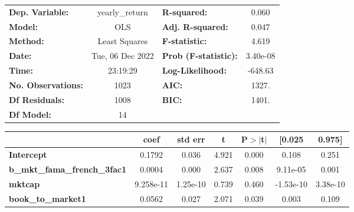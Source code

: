\begin{center}
\begin{tabular}{lclc}
\toprule
\textbf{Dep. Variable:}                                  &  yearly\_return  & \textbf{  R-squared:         } &     0.060   \\
\textbf{Model:}                                          &       OLS        & \textbf{  Adj. R-squared:    } &     0.047   \\
\textbf{Method:}                                         &  Least Squares   & \textbf{  F-statistic:       } &     4.619   \\
\textbf{Date:}                                           & Tue, 06 Dec 2022 & \textbf{  Prob (F-statistic):} &  3.40e-08   \\
\textbf{Time:}                                           &     23:19:29     & \textbf{  Log-Likelihood:    } &   -648.63   \\
\textbf{No. Observations:}                               &        1023      & \textbf{  AIC:               } &     1327.   \\
\textbf{Df Residuals:}                                   &        1008      & \textbf{  BIC:               } &     1401.   \\
\textbf{Df Model:}                                       &          14      & \textbf{                     } &             \\
\bottomrule
\end{tabular}
\begin{tabular}{lcccccc}
                                                         & \textbf{coef} & \textbf{std err} & \textbf{t} & \textbf{P$> |$t$|$} & \textbf{[0.025} & \textbf{0.975]}  \\
\midrule
\textbf{Intercept}                                       &       0.1792  &        0.036     &     4.921  &         0.000        &        0.108    &        0.251     \\
\textbf{b\_mkt\_fama\_french\_3fac1}                     &       0.0004  &        0.000     &     2.637  &         0.008        &     9.11e-05    &        0.001     \\
\textbf{mktcap}                                          &    9.258e-11  &     1.25e-10     &     0.739  &         0.460        &    -1.53e-10    &     3.38e-10     \\
\textbf{book\_to\_market1}                               &       0.0562  &        0.027     &     2.071  &         0.039        &        0.003    &        0.109     \\

\end{tabular}
\end{center}
